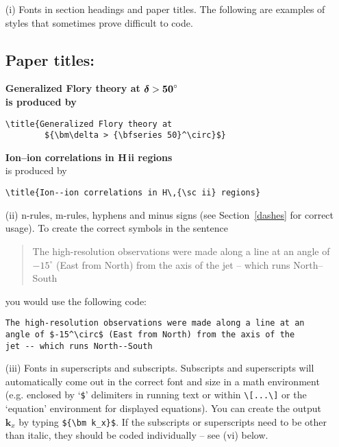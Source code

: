 \documentclass[]{tEIS2e}
\theoremstyle{plain}
\theoremstyle{remark}
\begin{document}
%
\begin{enumerate}
\item[(i)] Fonts in section headings and paper titles. The following are  examples
of styles that sometimes prove difficult to code.

\subsection*{Paper titles:}

\bf{\noindent Generalized Flory theory at ${\bm\delta >
{\bf 50}^\circ}$}\\

    \noindent\normalfont is produced by
\begin{verbatim}
\title{Generalized Flory theory at
        ${\bm\delta > {\bfseries 50}^\circ}$}
\end{verbatim}
\bigskip

{\bf{\noindent Ion--ion correlations in H\,{\sc ii} regions}}\\

\noindent\normalfont is produced by
%
\begin{verbatim}
\title{Ion--ion correlations in H\,{\sc ii} regions}
\end{verbatim}



\item[(ii)] n-rules, m-rules, hyphens and minus signs (see Section~\ref{dashes} for
correct usage). To create the correct symbols in the sentence
%
\begin{quote}
The high-resolution observations were made along a line at an
angle of $-15^\circ$ (East from North) from the axis of the
jet -- which runs North--South
\end{quote}
you would use the following code:
%
\begin{verbatim}
The high-resolution observations were made along a line at an
angle of $-15^\circ$ (East from North) from the axis of the
jet -- which runs North--South
\end{verbatim}

\item[(iii)] Fonts in superscripts and subscripts. Subscripts and superscripts will automatically come  out in the correct font
and size in a math environment (e.g. enclosed by `\verb"$"'
delimiters in running text or within \verb"\[...\]" or the
`equation' environment for displayed equations). You can create
the output ${\bm k_x}$ by typing \verb"${\bm k_x}$". If the
subscripts or superscripts need to be other than italic, they
should be coded individually -- see (vi) below.


\end{enumerate}
\end{document}
